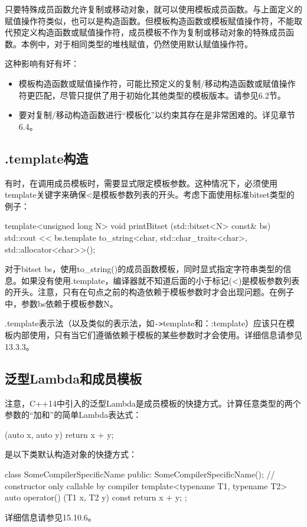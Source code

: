 只要特殊成员函数允许复制或移动对象，就可以使用模板成员函数。与上面定义的赋值操作符类似，也可以是构造函数。但模板构造函数或模板赋值操作符，不能取代预定义构造函数或赋值操作符，成员模板不作为复制或移动对象的特殊成员函数。本例中，对于相同类型的堆栈赋值，仍然使用默认赋值操作符。

这种影响有好有坏：

\begin{itemize}
\item 
模板构造函数或赋值操作符，可能比预定义的复制/移动构造函数或赋值操作符更匹配，尽管只提供了用于初始化其他类型的模板版本。请参见6.2节。

\item 
要对复制/移动构造函数进行“模板化”以约束其存在是非常困难的。详见章节6.4。
\end{itemize}

\subsection{.template构造}

有时，在调用成员模板时，需要显式限定模板参数。这种情况下，必须使用template关键字来确保<是模板参数列表的开头。考虑下面使用标准bitset类型的例子：

\begin{cpp}
template<unsigned long N>
void printBitset (std::bitset<N> const& bs) {
	std::cout << bs.template to_string<char, std::char_traits<char>,
			std::allocator<char>>();
}
\end{cpp}

对于bitset bs，使用to\_string()的成员函数模板，同时显式指定字符串类型的信息。如果没有使用.template，编译器就不知道后面的小于标记(<)是模板参数列表的开头。注意，只有在句点之前的构造依赖于模板参数时才会出现问题。在例子中，参数bs依赖于模板参数N。

.template表示法（以及类似的表示法，如\texttt{->}template和：:template）应该只在模板内部使用，只有当它们遵循依赖于模板的某些参数时才会使用。详细信息请参见13.3.3。

\subsection{泛型Lambda和成员模板}

注意，C++14中引入的泛型Lambda是成员模板的快捷方式。计算任意类型的两个参数的“加和”的简单Lambda表达式：

\begin{cpp}
[] (auto x, auto y) {
	return x + y;
}
\end{cpp}

是以下类默认构造对象的快捷方式：

\begin{cpp}
class SomeCompilerSpecificName {
	public:
	SomeCompilerSpecificName(); // constructor only callable by compiler
	template<typename T1, typename T2>
	auto operator() (T1 x, T2 y) const {
		return x + y;
	}
};
\end{cpp}

详细信息请参见15.10.6。








